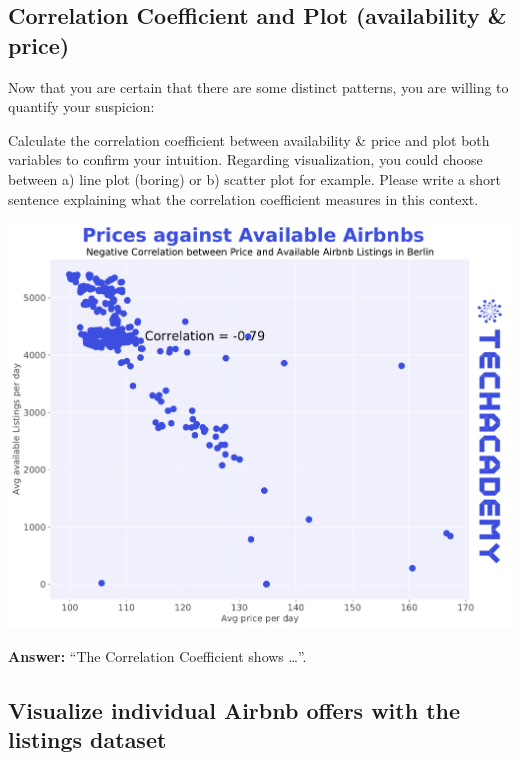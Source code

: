 \documentclass[
  11pt,
]{article}
\begin{document}
\hypertarget{correlation-coefficient-and-plot-availability-price}{%
\subsection{Correlation Coefficient and Plot (availability \& price)}\label{correlation-coefficient-and-plot-availability-price}}

Now that you are certain that there are some distinct patterns, you are willing to quantify your suspicion:

Calculate the correlation coefficient between availability \& price and plot both variables to confirm your intuition. Regarding visualization, you could choose between a) line plot (boring) or b) scatter plot for example. Please write a short sentence explaining what the correlation coefficient measures in this context.

\begin{center}\includegraphics[width=1\linewidth]{plot/01_python/corr_availability_price} \end{center}

\textbf{Answer:} ``The Correlation Coefficient shows \ldots{}''.

\hypertarget{visualize-individual-airbnb-offers-with-the-listings-dataset}{%
\subsection{Visualize individual Airbnb offers with the listings dataset}\label{visualize-individual-airbnb-offers-with-the-listings-dataset}}
\end{document}
